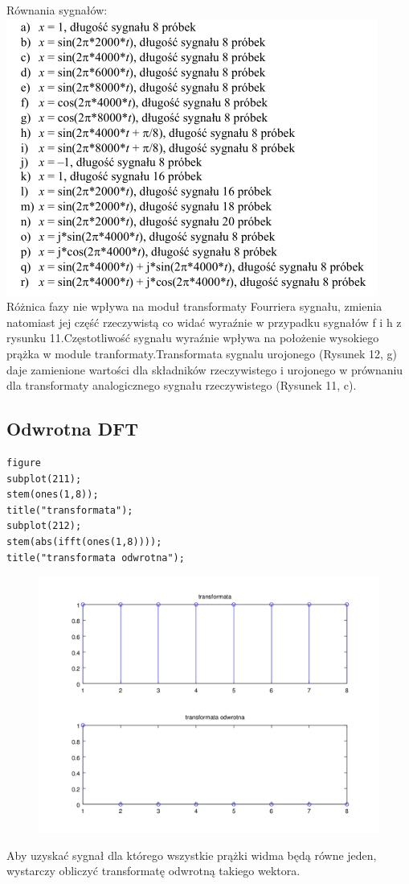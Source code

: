 \documentclass[12pt,titlepage]{report}
\begin{document}
Równania sygnałów:\\
\nolinebreak[4]
\includegraphics[scale=0.9]{../cw31_polecenie}\\
Różnica fazy nie wpływa na moduł transformaty Fourriera sygnału, zmienia natomiast jej część rzeczywistą co widać wyraźnie w przypadku sygnałów f i h z rysunku 11.Częstotliwość sygnału wyraźnie wpływa na położenie wysokiego prążka w module tranformaty.Transformata sygnalu urojonego (Rysunek 12, g) daje zamienione wartości dla składników rzeczywistego i urojonego w prównaniu dla transformaty analogicznego sygnału rzeczywistego (Rysunek 11, c).

\newpage
\subsection{Odwrotna DFT}
{
\scriptsize
\begin{verbatim}
figure
subplot(211);
stem(ones(1,8));
title("transformata");
subplot(212);
stem(abs(ifft(ones(1,8))));
title("transformata odwrotna");
\end{verbatim}
}
\begin{figure}[!h]
	\centering
	\includegraphics[scale=0.6]{../cw22_output}
	\caption{}
\end{figure}
Aby uzyskać sygnał dla którego wszystkie prążki widma będą równe jeden, wystarczy obliczyć transformatę odwrotną takiego wektora.
\newpage
\end{document}
